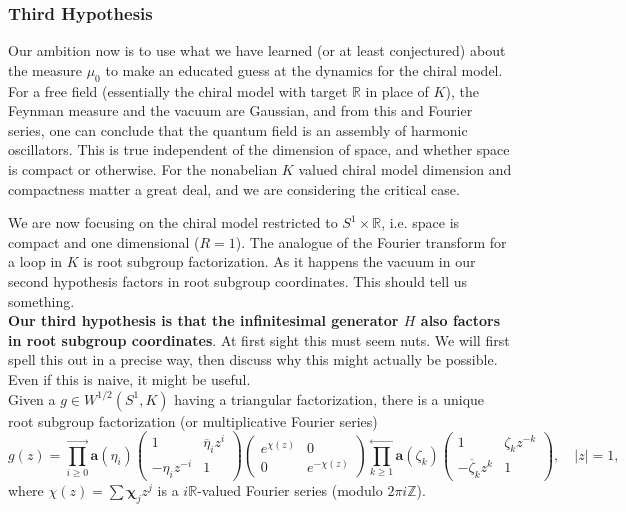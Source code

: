 \documentclass{amsart}
\theoremstyle{conjecture}
\theoremstyle{definition}
\theoremstyle{question}
\theoremstyle{questions}
\theoremstyle{remark}
\theoremstyle{remarks}
\theoremstyle{example}
\numberwithin{equation}{section}
\begin{document}
\subsubsection{Third Hypothesis}

Our ambition now is to use what we have learned (or at least conjectured) about the measure $\mu_0$ to make an educated guess at the dynamics for the chiral model. For a free field (essentially the chiral model with target $\mathbb R$ in place of $K$), the Feynman measure and the vacuum are Gaussian, and from this and Fourier series, one can conclude
that the quantum field is an assembly of harmonic oscillators. This is true independent of the dimension of space, and whether space is compact or otherwise. For the nonabelian $K$ valued chiral model dimension and compactness matter a great deal, and we are considering the critical case.

We are now focusing on the chiral model restricted to $S^1\times \mathbb R$, i.e. space is compact and one dimensional ($R=1$). The analogue of the Fourier transform for a loop in $K$ is root subgroup factorization. As it happens the vacuum in our second hypothesis factors in root subgroup coordinates. This should tell us something.\\

{\bf Our third hypothesis is that the infinitesimal generator $H$ also factors in root subgroup coordinates}. At first sight this must seem nuts. We will first spell this out in a precise way, then discuss why this might actually be possible. Even if this is naive, it might be useful.\\

Given a $g\in W^{1/2}(S^1,K)$ having a triangular factorization, there is a unique root subgroup factorization (or multiplicative Fourier series)
\begin{equation}\label{RSF}g(z)=\prod_{i\ge 0}^{\rightarrow}\mathbf a(\eta_i)\left(\begin{matrix} 1&\overline{\eta}_iz^i\\
-\eta_iz^{-i}&1\end{matrix} \right)\left(\begin{matrix} e^{\chi(z)}&0\\
0&e^{-\chi(z)}\end{matrix} \right)\prod_{k\ge 1}^{\leftarrow}\mathbf a(\zeta_k)\left(\begin{matrix} 1&\zeta_kz^{-k}\\
-\overline{\zeta}_kz^k&1\end{matrix} \right),\quad \vert
z\vert=1,\end{equation}
where $\chi(z)=\sum\mathbf{\chi}_jz^j$ is a $i\mathbb R$-valued Fourier series
(modulo $2\pi i\mathbb Z$).
\end{document}
